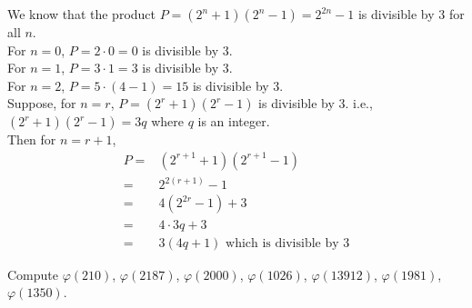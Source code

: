 \documentclass[12pt,class=book,crop=false]{standalone}
\begin{document}
\begin{soln}
    We know that the product $ P=\left( 2^n+1 \right)\left( 2^n-1 \right)=2^{2n}-1 $ is divisible by 3 for all $ n $.\\
    For $ n=0 $, $ P=2\cdot0=0 $ is divisible by 3.\\
    For $ n=1 $, $ P=3\cdot1=3 $ is divisible by 3.\\
    For $ n=2 $, $ P=5\cdot(4-1)=15 $ is divisible by 3.\\
    Suppose, for $ n=r $, $ P=\left( 2^r+1 \right)\left( 2^r-1 \right) $ is divisible by 3. i.e., $ \left( 2^r+1 \right)\left( 2^r-1 \right)=3q $ where $ q $ is an integer.\\
    Then for $ n=r+1 $,
    \begin{align*}
        P= & \left( 2^{r+1}+1 \right)\left( 2^{r+1}-1 \right)    \\
        =  & 2^{2(r+1)}-1                                        \\
        =  & 4\left(2^{2r}-1\right)+3                            \\
        =  & 4\cdot3q+3                                          \\
        =  & 3\left( 4q+1 \right)\text{ which is divisible by }3
    \end{align*}
\end{soln}
\begin{qn}
    Compute $ \varphi(210) $, $ \varphi(2187) $, $ \varphi(2000) $, $ \varphi(1026) $, $ \varphi(13912) $, $ \varphi(1981) $, $ \varphi(1350) $.
\end{qn}
\end{document}
